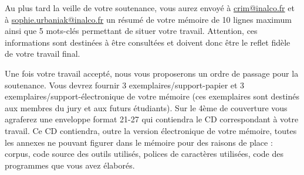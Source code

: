 Au plus tard la veille de votre soutenance, vous aurez envoyé à \url{crim@inalco.fr} et à \url{sophie.urbaniak@inalco.fr} un résumé de votre mémoire de 10 lignes maximum ainsi que 5 mots-clés permettant de situer votre travail. Attention, ces informations sont destinées à être consultées et doivent donc être le reflet fidèle de votre travail final.

Une fois votre travail accepté, nous vous proposerons un ordre de passage pour la soutenance. Vous devrez fournir 3 exemplaires/support-papier et 3 exemplaires/support-électronique de votre mémoire (ces exemplaires sont destinés aux membres du jury et aux futurs étudiants). Sur le 4ème de couverture vous agraferez une enveloppe format 21-27 qui contiendra le CD correspondant à votre travail. Ce CD contiendra, outre la version électronique de votre mémoire, toutes les annexes ne pouvant figurer dans le mémoire pour des raisons de place : corpus, code source des outils utilisés, polices de caractères utilisées, code des programmes que vous avez élaborés.
